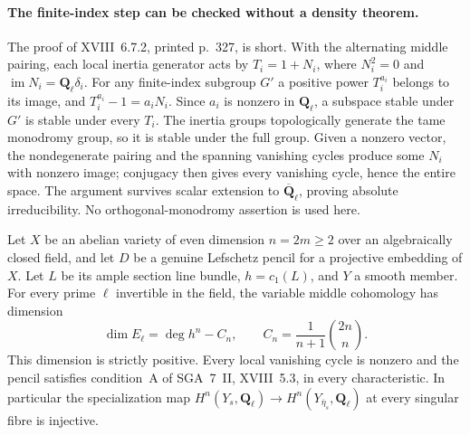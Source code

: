 \paragraph{The finite-index step can be checked without a density theorem.}
The proof of XVIII~6.7.2, printed p.~327, is short.  With the
alternating middle pairing, each local inertia generator acts by
$T_i=1+N_i$, where $N_i^2=0$ and
$\operatorname{im}N_i=\mathbf Q_\ell\delta_i$.
For any finite-index subgroup $G'$ a positive power $T_i^{a_i}$
belongs to its image, and
$T_i^{a_i}-1=a_iN_i$.  Since $a_i$ is nonzero in $\mathbf Q_\ell$,
a subspace stable under $G'$ is stable under every $T_i$.
The inertia groups topologically generate the tame monodromy group,
so it is stable under the full group.  Given a nonzero vector, the
nondegenerate pairing and the spanning vanishing cycles produce
some $N_i$ with nonzero image; conjugacy then gives every vanishing
cycle, hence the entire space.  The argument survives scalar
extension to $\overline{\mathbf Q}_\ell$, proving absolute
irreducibility.  No orthogonal-monodromy assertion is used here.

\begin{proposition}
\label{jac:P07}
Let $X$ be an abelian variety of even dimension $n=2m\ge2$ over an
algebraically closed field, and let $D$ be a genuine Lefschetz pencil
for a projective embedding of $X$.  Let $L$ be its ample section
line bundle, $h=c_1(L)$, and $Y$ a smooth member.  For every prime
$\ell$ invertible in the field, the variable middle cohomology has
dimension
\[
 \dim E_\ell=\deg h^n-C_n,
 \qquad C_n=\frac1{n+1}\binom{2n}{n}.
                                                        \tag{JAC.P07.1}
\]
This dimension is strictly positive.  Every local vanishing cycle
is nonzero and the pencil satisfies condition~A of SGA~7~II,
XVIII~5.3, in every characteristic.  In particular the
specialization map $H^n(Y_s,\mathbf Q_\ell)\to
H^n(Y_{\overline\eta_s},\mathbf Q_\ell)$ at every singular fibre
is injective.
\end{proposition}

